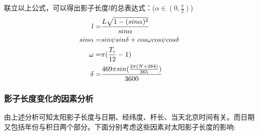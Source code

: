 \documentclass[12pt]{cumcmart}   %
\begin{document}
\makebox{}

联立以上公式，可以得出影子长度$l$的总表达式：($\alpha \in (0,\frac{\pi}{2})$)
\begin{align}
l=&\frac{L\sqrt{1-(sin\alpha)^2}}{sin\alpha} \label{lalpha} \\
sin \alpha=&sin \psi sin\delta +cos \omega cos \psi cos \delta \notag \\
\omega=&\pi(\frac{T_c}{12}-1) \notag \\
\delta=&\frac{469\pi sin(\frac{2\pi(N+284)}{365})}{3600}  \label{deta}
\end{align}

\subsubsection{影子长度变化的因素分析}
由上述分析可知太阳影子长度与日期、经纬度、杆长、当天北京时间有关。而日期又包括年份与积日两个部分。下面分别考虑这些因素对太阳影子长度的影响:
\end{document}
